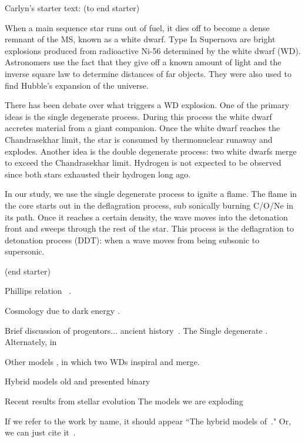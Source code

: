 \documentclass[iop,apj]{emulateapj}
\begin{document}
Carlyn's starter text: (to end starter)

When a main sequence star runs out of fuel, it dies off to become a dense
remnant of the MS, known as a white dwarf. Type Ia Supernova are bright
explosions produced from radioactive Ni-56 determined by the white dwarf
(WD). Astronomers use the fact that they give off a known amount of light
and the inverse square law to determine distances of far objects. They
were also used to find Hubble’s expansion of the universe.

 There has been debate over what triggers a WD explosion. One of the
 primary ideas is the single degenerate process. During this process
 the white dwarf accretes material from a giant companion. Once the
 white dwarf reaches the Chandrasekhar limit, the star is consumed
 by thermonuclear runaway and explodes. Another idea is the double
 degenerate process: two white dwarfs merge to exceed the Chandrasekhar
 limit. Hydrogen is not expected to be observed since both stars exhausted
 their hydrogen long ago.

In our study, we use the single degenerate process to ignite a flame. The
flame in the core starts out in the deflagration process, sub sonically
burning C/O/Ne in its path. Once it reaches a certain density, the
wave moves into the detonation front and sweeps through the rest of
the star. This process is the deflagration to detonation process (DDT):
when a wave moves from being subsonic to supersonic.

(end starter)





Phillips relation
~\citep{phillips:absolute}. 

Cosmology
due to dark energy \citep{riess.filippenko.ea:observational,
perlmutter.aldering.ea:measurements,leibundgut2001}. 

Brief discussion of progentors...
ancient history~\citep{hoylefowler60,arnett.truran.ea:nucleosynthesis}. The
Single degenerate 
\citep{hoylefowler60,trucam71,whelaniben73,Nomo84}. Alternately, in

Other models
\citep{webbink84,ibentutukov84}, in which two WDs inspiral and merge.

Hybrid models 
old 
\citep{denissenkovetal2015}
\citet{Wangetal2014} and \citet{Mengetal2014} presented binary


Recent results from stellar evolution
The models we are exploding \citep{brooksetal2017}

If we refer to the work by name, it should appear ``The hybrid models
of~\citet{brooksetal2017}." Or, we can just cite it~\citep{brooksetal2017}.
\end{document}
